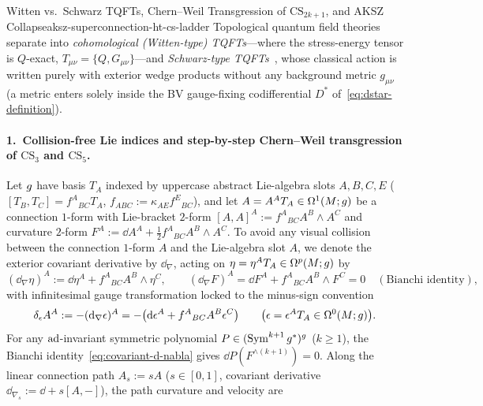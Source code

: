\begin{zkmodule}{Witten vs.\ Schwarz TQFTs, Chern--Weil Transgression of $\mathrm{CS}_{2k+1}$, and AKSZ Collapse}{aksz-superconnection-ht-cs-ladder}
Topological quantum field theories separate into \emph{cohomological (Witten-type) TQFTs}---where the stress-energy tensor is $Q$-exact, $T_{\mu\nu} = \{Q, G_{\mu\nu}\}$---and \emph{Schwarz-type TQFTs}~\cite{Witten89}, whose classical action is written purely with exterior wedge products without any background metric $g_{\mu\nu}$ (a metric enters solely inside the BV gauge-fixing codifferential $D^*$ of~\eqref{eq:dstar-definition}).

\paragraph{1.\ Collision-free Lie indices and step-by-step Chern--Weil transgression of $\mathrm{CS}_3$ and $\mathrm{CS}_5$.}
Let $g$ have basis $T_A$ indexed by uppercase abstract Lie-algebra slots $A, B, C, E$ ($[T_B, T_C] = f^A{}_{BC}T_A$, $f_{ABC} := \kappa_{AE}f^E{}_{BC}$), and let $A = A^A T_A \in \Omega^1(M;g)$ be a connection $1$-form with Lie-bracket $2$-form $[A, A]^A := f^A{}_{BC}A^B\wedge A^C$ and curvature $2$-form $F^A := \dd A^A + \frac{1}{2}f^A{}_{BC}A^B\wedge A^C$. To avoid any visual collision between the connection $1$-form $A$ and the Lie-algebra slot $A$, we denote the exterior covariant derivative by $\dd_\nabla$, acting on $\eta = \eta^A T_A \in \Omega^p(M;g)$ by
\begin{equation}
\label{eq:covariant-d-nabla}
(\dd_\nabla\eta)^A := \dd\eta^A + f^A{}_{BC}A^B\wedge\eta^C,\qquad
(\dd_\nabla F)^A = \dd F^A + f^A{}_{BC}A^B\wedge F^C = 0\quad (\text{Bianchi identity}),
\end{equation}
with infinitesimal gauge transformation locked to the minus-sign convention
\begin{equation}
\label{eq:gauge-var-minus-dnabla}
\delta_\epsilon A^A := -(\mathrm{d}_\nabla\epsilon)^A = -\bigl(\mathrm{d}\epsilon^A + f^A{}_{BC}A^B\epsilon^C\bigr)\qquad \bigl(\epsilon = \epsilon^A T_A \in \Omega^0(M;g)\bigr).
\end{equation}
For any $\operatorname{ad}$-invariant symmetric polynomial $P \in (\operatorname{Sym}^{k+1}g^*)^{g}$ ($k \ge 1$), the Bianchi identity~\eqref{eq:covariant-d-nabla} gives $\dd P(F^{\wedge(k+1)}) = 0$. Along the linear connection path $A_s := sA$ ($s \in [0,1]$, covariant derivative $\dd_{\nabla_s} := \dd + s[A, -]$), the path curvature and velocity are
\begin{equation}

\end{equation}
\end{zkmodule}
